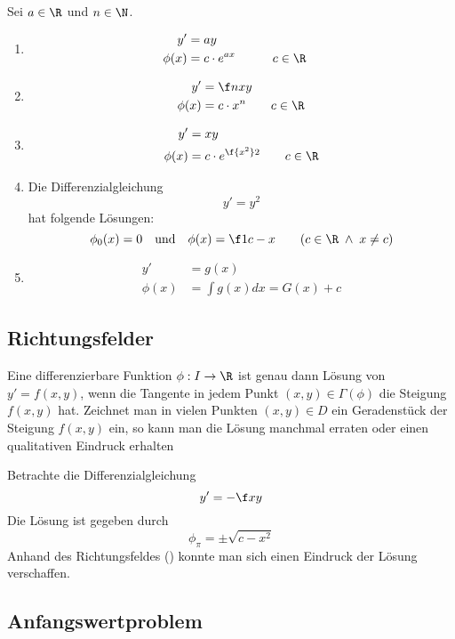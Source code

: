 \documentclass{mycourse}
\begin{document}
\begin{ex*}
	Sei $a \in \R$ und $n\in \N$.
	\begin{enumerate}[1)]
		\item
			\begin{alignat*}{3}
				y' &= ay\\ 
  \phi(x) &= c \cdot e^{ax} &&\qquad c\in \R
			\end{alignat*}
		\item
			\begin{align*}
				y' &= \f nx y \\
  \phi(x) &= c \cdot x^n \qquad c\in \R
			\end{align*}
		\item
			\begin{align*}
				y' &= xy \\
		   \phi(x) &= c \cdot e^{\f {x^2}2}  \qquad c\in \R
			\end{align*}
		\item
			Die Differenzialgleichung
			\[
				y' = y^2
			\]
			hat folgende Lösungen:
			\[
				\phi_0(x) = 0 \quad \text{und} \quad \phi(x)= \f 1{c-x} \qquad (c\in \R \;\land\; x\neq c)
			\]
		\item
			\begin{align*}
				y' &= g(x) \\
		   \phi(x) &= \int g(x) dx =  G(x) + c
			\end{align*}
	\end{enumerate}
\end{ex*}

\subsection{Richtungsfelder}

Eine differenzierbare Funktion $\phi:I\to \R$ ist genau dann Lösung von $y'=f(x,y)$, wenn die Tangente in jedem Punkt $(x,y)\in \Gamma(\phi)$ die Steigung $f(x,y)$ hat.
Zeichnet man in vielen Punkten $(x,y)\in D$ ein Geradenstück der Steigung $f(x,y)$ ein, so kann man die Lösung manchmal erraten oder einen qualitativen Eindruck erhalten

\begin{ex*}
	Betrachte die Differenzialgleichung
	\[
		y' = -\f xy
	\]
	Die Lösung ist gegeben durch
	\[
		\phi_\pi = \pm\sqrt{c-x^2}
	\]
	Anhand des Richtungsfeldes (\fixme[Graphik]) konnte man sich einen Eindruck der Lösung verschaffen. 
\end{ex*}

\subsection{Anfangswertproblem}
\end{document}

